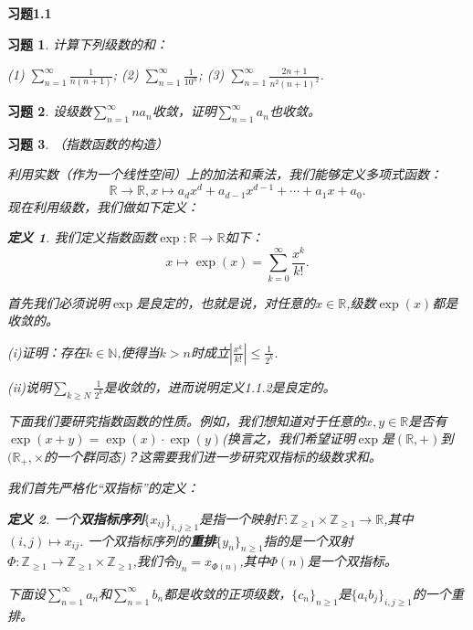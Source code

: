 \documentclass{article}
\newtheorem{definition}{定义}[subsection]
\newtheorem{problem}{习题}[subsection]
\begin{document}
\begin{center}
\begin{large}
\textbf{习题1.1}
\end{large}
\end{center}
\begin{problem}
计算下列级数的和：\par
(1) $\sum_{n=1}^\infty\frac{1}{n(n+1)}$;\hspace{1cm}
(2) $\sum_{n=1}^\infty\frac{1}{10^n}$;\hspace{1cm}
(3) $\sum_{n=1}^\infty\frac{2n+1}{n^2(n+1)^2}$.
\end{problem}
\begin{problem}
设级数$\sum_{n=1}^\infty na_n$收敛，证明$\sum_{n=1}^\infty a_n$也收敛。
\end{problem}
\begin{problem}\em（指数函数的构造）\par
利用实数（作为一个线性空间）上的加法和乘法，我们能够定义多项式函数：
$$
\mathbb{R} \rightarrow \mathbb{R} ,x\mapsto a_dx^d+a_{d-1}x^{d-1}+\cdots +a_1x+a_0.
$$
现在利用级数，我们做如下定义：
\begin{definition}
我们定义指数函数$\exp:\mathbb{R}\to\mathbb{R}$如下：
$$
x\mapsto \exp \left( x \right) =\sum_{k=0}^{\infty}{\frac{x^k}{k!}}.
$$
\end{definition}
首先我们必须说明$\exp$是良定的，也就是说，对任意的$x\in\mathbb{R}$,级数$\exp(x)$都是收敛的。\par
(i)证明：存在$k\in\mathbb{N}$,使得当$k>n$时成立$\left|\frac{x^k}{k!}\right|\le\frac{1}{2^k}$.\par
(ii)说明$\sum_{k\ge N}\frac{1}{2^k}$是收敛的，进而说明定义1.1.2是良定的。\par
下面我们要研究指数函数的性质。例如，我们想知道对于任意的$x,y\in\mathbb{R}$是否有$\exp(x+y)=\exp(x)\cdot\exp(y)$(换言之，我们希望证明$\exp$是$(\mathbb{R},+)$到$(\mathbb{R}_+,\times$的一个群同态)？这需要我们进一步研究双指标的级数求和。\par
我们首先严格化“双指标”的定义：
\begin{definition}
一个\textbf{双指标序列}$\{x_{ij}\}_{i,j\ge 1}$是指一个映射$F:\mathbb{Z}_{\ge 1}\times\mathbb{Z}_{\ge 1}\to\mathbb{R}$,其中$(i,j)\mapsto x_{ij}$. 一个双指标序列的\textbf{重排}$\{y_n\}_{n\ge 1}$指的是一个双射$\Phi:\mathbb{Z}_{\ge 1}\to\mathbb{Z}_{\ge 1}\times\mathbb{Z}_{\ge 1}$,我们令$y_n=x_{\Phi(n)}$,其中$\Phi(n)$是一个双指标。
\end{definition}
下面设$\sum_{n=1}^\infty a_n$和$\sum_{n=1}^\infty b_n$都是收敛的正项级数，$\{c_n\}_{n\ge 1}$是$\{a_ib_j\}_{i,j\ge 1}$的一个重排。\par

\end{problem}
\end{document}
